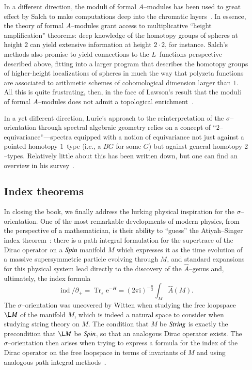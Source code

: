 In a different direction, the moduli of formal $A$--modules has been used to great effect by Salch to make computations deep into the chromatic layers~\cite{Salch}.  In essence, the theory of formal $A$--modules grant access to multiplicative ``height amplification'' theorems: deep knowledge of the homotopy groups of spheres at height $2$ can yield extensive information at height $2 \cdot 2$, for instance.  Salch's methods also promise to yield connections to the $L$--functions perspective described above, fitting into a larger program that describes the homotopy groups of higher-height localizations of spheres in much the way that polyzeta functions are associated to arithmetic schemes of cohomological dimension larger than $1$.  All this is quite frustrating, then, in the face of Lawson's result that the moduli of formal $A$--modules does not admit a topological enrichment~\cite{LawsonRealizability}.

In a yet different direction, Lurie's approach to the reinterpretation of the $\sigma$--orientation through spectral algebraic geometry relies on a concept of ``$2$--equivariance''---spectra equipped with a notion of equivariance not just against a pointed homotopy $1$--type (i.e., a $BG$ for some $G$) but against general homotopy $2$--types.  Relatively little about this has been written down, but one can find an overview in his survey~\cite[Section 5.3]{LurieSurveyOfEll}.



\subsection*{Index theorems}

In closing the book, we finally address the lurking physical inspiration for the $\sigma$--orientation.  One of the most remarkable developments of modern physics, from the perspective of a mathematician, is their ability to ``guess'' the Atiyah--Singer index theorem~\cite[Section 8.6]{Takhtajan}: there is a path integral formulation for the supertrace of the Dirac operator on a $\mathit{Spin}$ manifold $M$ which expresses it as the time evolution of a massive supersymmetric particle evolving through $M$, and standard expansions for this physical system lead directly to the discovery of the $\widehat A$--genus and, ultimately, the index formula \[\operatorname{ind} /\!\!\!\partial_+ = \operatorname{Tr}_s \mathrm e^{-H} = (2 \pi \mathrm i)^{-\frac{n}{2}} \int_M \widehat A(M).\]  The $\sigma$--orientation was uncovered by Witten when studying the free loopspace $\L M$ of the manifold $M$, which is indeed a natural space to consider when studying string theory on $M$.  The condition that $M$ be $\mathit{String}$ is exactly the precondition that $\L M$ be $\mathit{Spin}$, so that an analogous Dirac operator exists.  The $\sigma$--orientation then arises when trying to express a formula for the index of the Dirac operator on the free loopspace in terms of invariants of $M$ and using analogous path integral methods~\cite{SegalEll}.

